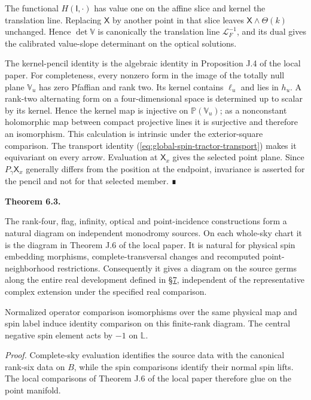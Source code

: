\documentclass[
  english,
  11pt,
  reqno]{amsart}
\makeatletter
\newcommand{\pandocstatementheading}[1]{%
  \par\addpenalty{\@beginparpenalty}%
  \addvspace{.5\baselineskip plus .2\baselineskip minus .2\baselineskip}%
  {\normalfont\bfseries #1\par}%
  \nobreak\@afterindenttrue\@afterheading
}
\makeatother
\begin{document}
The functional \(H(\mathsf I,\cdot)\) has value one on the affine slice
and kernel the translation line. Replacing \(\mathsf X\) by another
point in that slice leaves \(\mathsf X\wedge\Theta(k)\) unchanged. Hence
\(\det\mathbb V\) is canonically the translation line
\(\mathcal L_F^{-1}\), and its dual gives the calibrated value-slope
determinant on the optical solutions.

The kernel-pencil identity is the algebraic identity in Proposition J.4
of the local paper. For completeness, every nonzero form in the image of
the totally null plane \(\mathbb V_u\) has zero Pfaffian and rank two.
Its kernel contains \(\ell_u\) and lies in \(h_u\). A rank-two
alternating form on a four-dimensional space is determined up to scalar
by its kernel. Hence the kernel map is injective on
\(\mathbb P(\mathbb V_u)\); as a nonconstant holomorphic map between
compact projective lines it is surjective and therefore an isomorphism.
This calculation is intrinsic under the exterior-square comparison. The
transport identity (\ref{eq:global-spin-tractor-transport}) makes it
equivariant on every arrow. Evaluation at \(\mathsf X_x\) gives the
selected point plane. Since \(P_\gamma\mathsf X_x\) generally differs
from the position at the endpoint, invariance is asserted for the pencil
and not for that selected member. ∎

\pandocstatementheading{\protect{}\label{thm:global-projective-diagram-naturality}Theorem 6.3.}

The rank-four, flag, infinity, optical and point-incidence constructions
form a natural diagram on independent monodromy sources. On each
whole-sky chart it is the diagram in Theorem J.6 of the local paper. It
is natural for physical spin embedding morphisms, complete-transversal
changes and recomputed point-neighborhood restrictions. Consequently it
gives a diagram on the source germs along the entire real development
defined in \hyperref[sec:germ-correspondence-v08]{§7}, independent of
the representative complex extension under the specified real
comparison.

Normalized operator comparison isomorphisms over the same physical map
and spin label induce identity comparison on this finite-rank diagram.
The central negative spin element acts by \(-1\) on \(\mathbb L\).

\emph{Proof.} Complete-sky evaluation identifies the source data with
the canonical rank-six data on \(B\), while the spin comparisons
identify their normal spin lifts. The local comparisons of Theorem J.6
of the local paper therefore glue on the point manifold.
\end{document}
